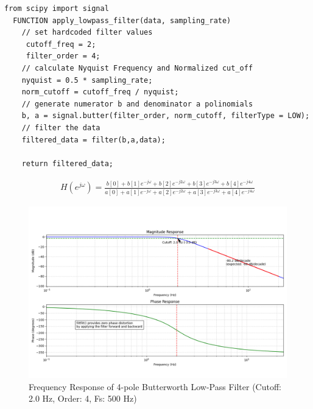 \begin{lstlisting}[style=cstyle, caption=Python apply\_lowpass\_filter() PseudoCode, label=lst:pythonLowPassFilter]
  from scipy import signal
  FUNCTION apply_lowpass_filter(data, sampling_rate)
    // set hardcoded filter values
     cutoff_freq = 2;
     filter_order = 4;
    // calculate Nyquist Frequency and Normalized cut_off
    nyquist = 0.5 * sampling_rate;
    norm_cutoff = cutoff_freq / nyquist;
    // generate numerator b and denominator a polinomials 
    b, a = signal.butter(filter_order, norm_cutoff, filterType = LOW);
    // filter the data
    filtered_data = filter(b,a,data);

    return filtered_data;

\end{lstlisting}


\begin{equation} \label{DTFT-TF}
  \begin{split}
    H(e^{j\omega}) = \frac{b[0] + b[1]e^{-j\omega} + b[2]e^{-j2\omega} + b[3]e^{-j3\omega} + b[4]e^{-j4\omega}}{a[0] + a[1]e^{-j\omega} + a[2]e^{-j2\omega} + a[3]e^{-j3\omega} + a[4]e^{-j4\omega}}
  \end{split}
\end{equation}

\begin{figure}[htbp] 
  \centering
  \includegraphics[width=1\textwidth]{chapters/methodology/ArduinoDAQ/filter_response.png}
  \caption{Frequency Response of 4-pole Butterworth Low-Pass Filter (Cutoff: 2.0 Hz, Order: 4, Fs: 500 Hz)}
  \label{fig:filterResponse}
\end{figure}

